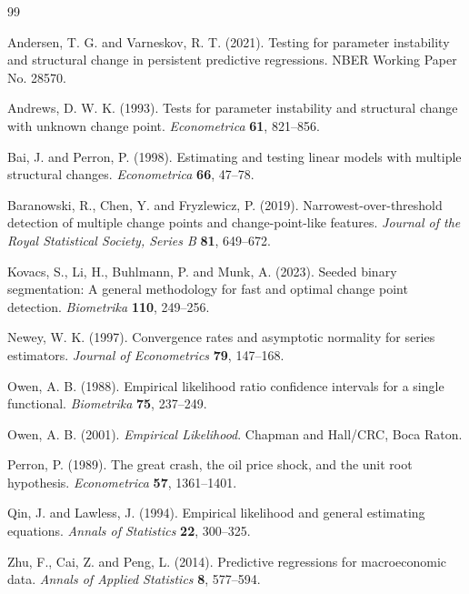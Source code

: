 \documentclass[12pt]{article} %
\numberwithin{equation}{section}
\theoremstyle{definition}
\begin{document}
\begin{thebibliography}{99}

Andersen, T. G. and Varneskov, R. T. (2021).
Testing for parameter instability and structural change in persistent predictive regressions.
NBER Working Paper No. 28570.

Andrews, D. W. K. (1993).
Tests for parameter instability and structural change with unknown change point.
{\it Econometrica} {\bf 61}, 821--856.

Bai, J. and Perron, P. (1998).
Estimating and testing linear models with multiple structural changes.
{\it Econometrica} {\bf 66}, 47--78.

Baranowski, R., Chen, Y. and Fryzlewicz, P. (2019).
Narrowest-over-threshold detection of multiple change points and change-point-like features.
{\it Journal of the Royal Statistical Society, Series B} {\bf 81}, 649--672.

Kovacs, S., Li, H., Buhlmann, P. and Munk, A. (2023).
Seeded binary segmentation: A general methodology for fast and optimal change point detection.
{\it Biometrika} {\bf 110}, 249--256.

Newey, W. K. (1997).
Convergence rates and asymptotic normality for series estimators.
{\it Journal of Econometrics} {\bf 79}, 147--168.

Owen, A. B. (1988).
Empirical likelihood ratio confidence intervals for a single functional.
{\it Biometrika} {\bf 75}, 237--249.

Owen, A. B. (2001).
{\it Empirical Likelihood}.
Chapman and Hall/CRC, Boca Raton.

Perron, P. (1989).
The great crash, the oil price shock, and the unit root hypothesis.
{\it Econometrica} {\bf 57}, 1361--1401.

Qin, J. and Lawless, J. (1994).
Empirical likelihood and general estimating equations.
{\it Annals of Statistics} {\bf 22}, 300--325.

Zhu, F., Cai, Z. and Peng, L. (2014).
Predictive regressions for macroeconomic data.
{\it Annals of Applied Statistics} {\bf 8}, 577--594.

\end{thebibliography}
\end{document}
